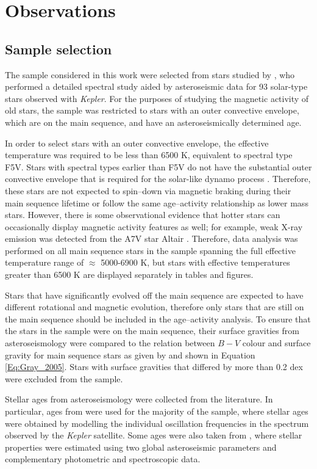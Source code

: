 \section{Observations}
\subsection{Sample selection}
\label{Chp4_obs_sample_selection}
The sample considered in this work were selected from stars studied by \citet{Bruntt_etal_2012}, who performed a detailed spectral study aided by asteroseismic data for 93 solar-type stars observed with \textit{Kepler}. For the purposes of studying the magnetic activity of old stars, the sample was restricted to stars with an outer convective envelope, which are on the main sequence, and have an asteroseismically determined age.

In order to select stars with an outer convective envelope, the effective temperature was required to be less than 6500 K, equivalent to spectral type F5V. Stars with spectral types earlier than F5V do not have the substantial outer convective envelope that is required for the solar-like dynamo process \citep{Pinsonneault_etal_2001}. Therefore, these stars are not expected to spin--down via magnetic braking during their main sequence lifetime or follow the same age--activity relationship as lower mass stars. However, there is some observational evidence that hotter stars can occasionally display magnetic activity features as well; for example, weak X-ray emission was detected from the A7V star Altair \citep{Robrade_Schmitt_2009}. Therefore, data analysis was performed on all main sequence stars in the sample spanning the full effective temperature range of $\approx$ 5000-6900 K, but stars with effective temperatures greater than 6500 K are displayed separately in tables and figures.

Stars that have significantly evolved off the main sequence are expected to have different rotational and magnetic evolution, therefore only stars that are still on the main sequence should be included in the age--activity analysis. To ensure that the stars in the sample were on the main sequence, their surface gravities from asteroseismology \citep{Bruntt_etal_2012} were compared to the relation between $B-V$ colour and surface gravity for main sequence stars as given by \citet{Gray_2005} and shown in Equation \ref{Eq:Gray_2005}. Stars with surface gravities that differed by more than 0.2 dex were excluded from the sample.

Stellar ages from asteroseismology were collected from the literature. In particular, ages from \citet{Silva_Aguirre_etal_2017} were used for the majority of the sample, where stellar ages were obtained by modelling the individual oscillation frequencies in the spectrum observed by the \textit{Kepler} satellite. Some ages were also taken from \citet{Chaplin_etal_2014}, where stellar properties were estimated using two global asteroseismic parameters and complementary photometric and spectroscopic data.

